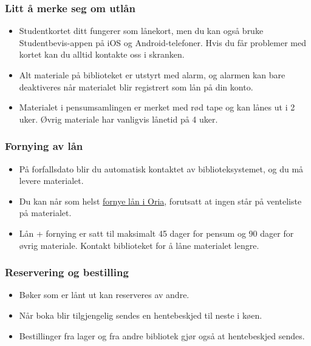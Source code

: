 \documentclass{beamer}
\begin{document}
\begin{frame}
  \frametitle{Litt å merke seg om utlån}

  \begin{itemize}
  \item Studentkortet ditt fungerer som lånekort, men du kan også bruke \alert{Studentbevis-appen} på iOS og Android-telefoner. Hvis du får problemer med kortet kan du alltid kontakte oss i skranken.
  \item Alt materiale på biblioteket er utstyrt med \alert{alarm}, og alarmen kan bare deaktiveres når materialet blir registrert som lån på din konto.
  \item Materialet i pensumsamlingen er merket med rød tape og kan lånes ut i 2 uker. Øvrig materiale har vanligvis lånetid på 4 uker.
  \end{itemize}
\end{frame}

\begin{frame}
  \frametitle{Fornying av lån}

  \begin{itemize}
  \item På forfallsdato blir du automatisk kontaktet av biblioteksystemet, og du må levere materialet.
  \item Du kan når som helst \href{https://bibsys-almaprimo.hosted.exlibrisgroup.com/primo_library/libweb/action/login.do?loginFn=signin&vid=DMMH&targetURL=https://bibsys-almaprimo.hosted.exlibrisgroup.com/primo_library/libweb/action/myAccountMenu.do?vid=DMMH&fromLink=gotoMyAccountUI}{fornye lån i Oria}, forutsatt at ingen står på venteliste på materialet.
  \item Lån + fornying er satt til maksimalt 45 dager for pensum og 90 dager for øvrig materiale. Kontakt biblioteket for å låne materialet lengre.
  \end{itemize}
\end{frame}

\begin{frame}
  \frametitle{Reservering og bestilling}

  \begin{itemize}
  \item Bøker som er lånt ut kan reserveres av andre.
  \item Når boka blir tilgjengelig sendes en hentebeskjed til neste i køen.
  \item Bestillinger fra lager og fra andre bibliotek gjør også at hentebeskjed sendes.
  \end{itemize}
\end{frame}
\end{document}
